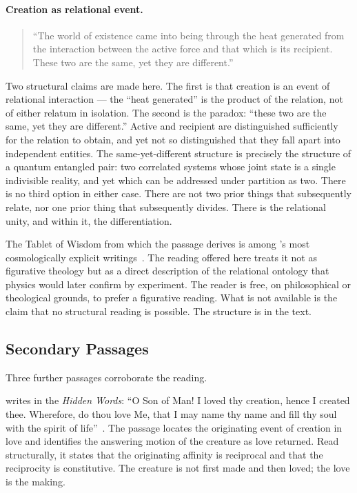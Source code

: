 \paragraph{Creation as relational event.}
\begin{quote}
``The world of existence came into being through the heat generated
from the interaction between the active force and that which is its recipient.
These two are the same, yet they are different.''
\citep[\S 2.2]{BSW}
\end{quote}

Two structural claims are made here.
The first is that creation is an event of relational interaction --- the
``heat generated'' is the product of the relation, not of either relatum in
isolation.
The second is the paradox: ``these two are the same, yet they are different.''
Active and recipient are distinguished sufficiently for the relation to obtain,
and yet not so distinguished that they fall apart into independent entities.
The same-yet-different structure is precisely the structure of a quantum
entangled pair: two correlated systems whose joint state is a single
indivisible reality, and yet which can be addressed under partition as two.
There is no third option in either case.
There are not two prior things that subsequently relate, nor one prior thing
that subsequently divides.
There is the relational unity, and within it, the differentiation.

The Tablet of Wisdom from which the passage derives is among
\Bahaullah's most cosmologically explicit writings~\citep{TabletsBahaullah}.
The reading offered here treats it not as figurative theology but as a direct
description of the relational ontology that physics would later confirm by
experiment.
The reader is free, on philosophical or theological grounds, to prefer a
figurative reading.
What is not available is the claim that no structural reading is possible.
The structure is in the text.

\subsection{Secondary Passages}

Three further passages corroborate the reading.

\Bahaullah writes in the \textit{Hidden Words}:
``O Son of Man! I loved thy creation, hence I created thee.
Wherefore, do thou love Me, that I may name thy name and fill thy soul
with the spirit of life''~\citep[Arabic 4]{HiddenWords}.
The passage locates the originating event of creation in love and identifies
the answering motion of the creature as love returned.
Read structurally, it states that the originating affinity is reciprocal and
that the reciprocity is constitutive.
The creature is not first made and then loved; the love is the making.

